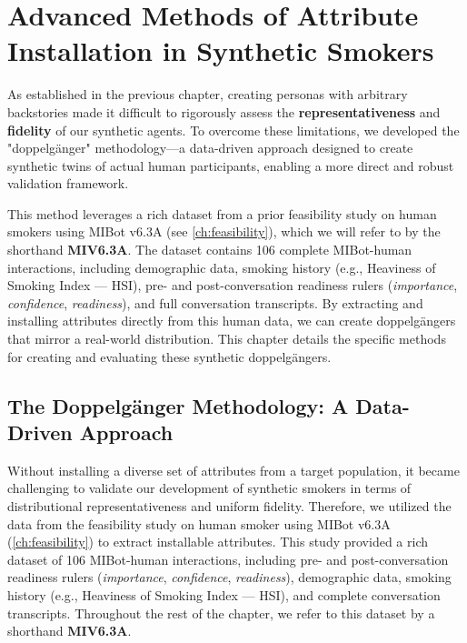\chapter{Advanced Methods of Attribute Installation in Synthetic Smokers}
\label{ch:synthetic-doppelganger}

As established in the previous chapter, creating personas with arbitrary backstories made it difficult to rigorously assess the \textbf{representativeness} and \textbf{fidelity} of our synthetic agents. To overcome these limitations, we developed the "doppelgänger" methodology---a data-driven approach designed to create synthetic twins of actual human participants, enabling a more direct and robust validation framework.

This method leverages a rich dataset from a prior feasibility study on human smokers using MIBot v6.3A (see \cref{ch:feasibility}), which we will refer to by the shorthand \textbf{MIV6.3A}. The dataset contains 106 complete MIBot-human interactions, including demographic data, smoking history (e.g., Heaviness of Smoking Index --- HSI), pre- and post-conversation readiness rulers (\emph{importance}, \emph{confidence}, \emph{readiness}), and full conversation transcripts. By extracting and installing attributes directly from this human data, we can create doppelgängers that mirror a real-world distribution. This chapter details the specific methods for creating and evaluating these synthetic doppelgängers.

\section{The Doppelgänger Methodology: A Data-Driven Approach}
\label{sec:synthetic-smoker-doppelgänger}


Without installing a diverse set of attributes from a target population, it became challenging to validate our development of synthetic smokers in terms of distributional representativeness and uniform fidelity. 
Therefore, we utilized the data from the feasibility study on human smoker using MIBot v6.3A (\cref{ch:feasibility}) to extract installable attributes. This study provided a rich dataset of 106 MIBot-human interactions, including pre- and post-conversation readiness rulers (\emph{importance}, \emph{confidence}, \emph{readiness}), demographic data, smoking history (e.g., Heaviness of Smoking Index --- HSI), and complete conversation transcripts. Throughout the rest of the chapter, we refer to this dataset by a shorthand \textbf{MIV6.3A}.

